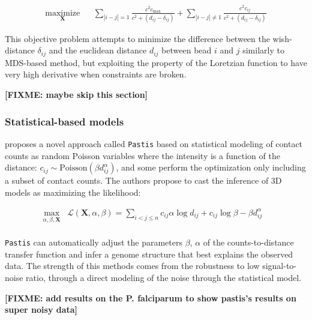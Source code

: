 \documentclass[letterpaper,12pt]{article}
\newcommand{\fixme}[1]{\textbf{[FIXME: #1]}}
\newcommand{\Xb}{\textbf{X}}
\begin{document}
\begin{equation*}
\renewcommand{\arraystretch}{2}
\begin{array}{ccl}
\underset{\Xb}{\text{maximize}} & & \underset{| i - j | = 1}{\sum} \frac{c^2
c_\text{max}}{c^2 + (d_{ij} - \delta_{ij})} + 
\underset{| i - j | \neq 1}{\sum} \frac{c^2 c_{ij}}{c^2 + (d_{ij} - \delta_{ij})}
\end{array}
\end{equation*}

This objective problem attempts to minimize the difference between the
wish-distance $\delta_{ij}$ and the euclidean distance $d_{ij}$ between bead
$i$ and $j$ similarly to MDS-based method, but exploiting the property of the
Loretzian function to have very high derivative when constraints are broken.

\fixme{maybe skip this section}


\subsubsection*{Statistical-based models}

\citet{varoquaux:statistical} proposes a novel approach called \texttt{Pastis}
based on statistical modeling of contact counts as random Poisson variables
where the intensity is a function of the distance: $c_{ij} \sim
\text{Poisson}(\beta d_{ij}^\alpha)$, and some perform the optimization only
including a subset of contact counts. The authors propose to cast the
inference of 3D models as maximizing the likelihood:

\begin{equation}
\renewcommand{\arraystretch}{2}
\begin{array}{cll}
\underset{\alpha, \beta, \textbf{X}}{\text{max}} &
\mathcal{L}(\mathbf{X}, \alpha, \beta) = \underset{i<j\leq n}{\sum}  c_{ij}
\alpha \log d_{ij} + c_{ij} \log \beta - \beta d_{ij}^\alpha &\\
\end{array}
\end{equation}


\texttt{Pastis} can automatically adjust the parameters $\beta$, $\alpha$ of
the counts-to-distance transfer function and infer a genome structure that
best explains the observed data. The strength of this methods comes from the
robustness to low signal-to-noise ratio, through a direct modeling of the
noise through the statistical model.

\fixme{add results on the P. falciparum to show pastis's results on 
super noisy data}
\end{document}
